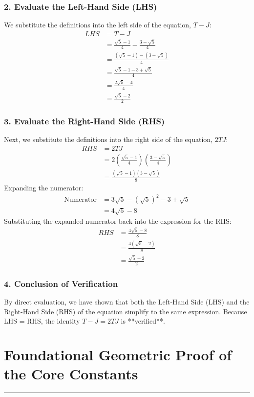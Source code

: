 \subsubsection*{2. Evaluate the Left-Hand Side (LHS)}
We substitute the definitions into the left side of the equation, $T-J$:
\begin{align*}
LHS &= T - J \\
&= \frac{\sqrt{5}-1}{4} - \frac{3-\sqrt{5}}{4} \\
&= \frac{(\sqrt{5}-1) - (3-\sqrt{5})}{4} \\
&= \frac{\sqrt{5}-1-3+\sqrt{5}}{4} \\
&= \frac{2\sqrt{5}-4}{4} \\
&= \frac{\sqrt{5}-2}{2}
\end{align*}

\subsubsection*{3. Evaluate the Right-Hand Side (RHS)}
Next, we substitute the definitions into the right side of the equation, $2TJ$:
\begin{align*}
RHS &= 2TJ \\
&= 2 \left( \frac{\sqrt{5}-1}{4} \right) \left( \frac{3-\sqrt{5}}{4} \right) \\
&= \frac{(\sqrt{5}-1)(3-\sqrt{5})}{8}
\end{align*}
Expanding the numerator:
\begin{align*}
\text{Numerator} &= 3\sqrt{5} - (\sqrt{5})^2 - 3 + \sqrt{5} \\
&= 4\sqrt{5} - 8
\end{align*}
Substituting the expanded numerator back into the expression for the RHS:
\begin{align*}
RHS &= \frac{4\sqrt{5} - 8}{8} \\
&= \frac{4(\sqrt{5}-2)}{8} \\
&= \frac{\sqrt{5}-2}{2}
\end{align*}

\subsubsection*{4. Conclusion of Verification}
By direct evaluation, we have shown that both the Left-Hand Side (LHS) and the Right-Hand Side (RHS) of the equation simplify to the same expression. Because LHS = RHS, the identity $T - J = 2TJ$ is **verified**.

\newpage
\section{Foundational Geometric Proof of the Core Constants}
\label{sec:geometric_proof}
\hrule
\vspace{1em}


